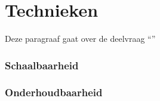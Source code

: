 \chapter{Technieken}

\label{Chapter3}

Deze paragraaf gaat over de deelvraag \enquote{\deeltechnieken}

\subsection{Schaalbaarheid}

\subsection{Onderhoudbaarheid}